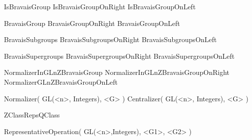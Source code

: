 





\begintt
IsBravaisGroup
IsBravaisGroupOnRight
IsBravaisGroupOnLeft

BravaisGroup
BravaisGroupOnRight
BravaisGroupOnLeft

BravaisSubgroups
BravaisSubgroupsOnRight
BravaisSubgroupsOnLeft

BravaisSupergroups
BravaisSupergroupsOnRight
BravaisSupergroupsOnLeft

NormalizerInGLnZBravaisGroup
NormalizerInGLnZBravaisGroupOnRight 
NormalizerGLnZBravaisGroupOnLeft 

Normalizer(  GL(<n>, Integers), <G> ) 
Centralizer( GL(<n>, Integers), <G> )

ZClassRepsQClass

RepresentativeOperation( GL(<n>,Integers), <G1>, <G2> )
\endtt





